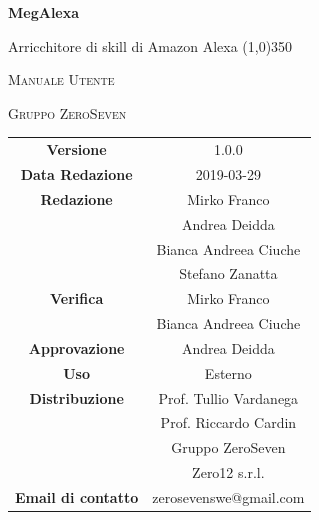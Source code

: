 \documentclass[a4paper,12pt,openany]{book}
\author{Ludovico Brocca}
\date{2018-12-19}
\begin{document}
\begin{titlepage}
	\centering
	{\huge\bfseries MegAlexa \par}
	Arricchitore di skill di Amazon Alexa
	\line(1,0){350} \\
	{\scshape\LARGE Manuale Utente \par}
	\vspace{1cm}
	{\scshape Gruppo ZeroSeven \par}
	\logo
	\begin{tabular}{c|c}
		{\hfill \textbf{Versione}} 			& 1.0.0 \\
		{\hfill\textbf{Data Redazione}} 	& 2019-03-29	\\ 
		{\hfill\textbf{Redazione}} 		& Mirko Franco \\ & Andrea Deidda \\& Bianca Andreea Ciuche\\ & Stefano Zanatta \\
		{\hfill\textbf{Verifica}} 				&  	Mirko Franco \\ & Bianca Andreea Ciuche \\
		{\hfill\textbf{Approvazione}} 		& Andrea Deidda \\
		{\hfill\textbf{Uso}} 					& 		Esterno		\\ 
		{\hfill\textbf{Distribuzione}} 			& 			Prof. Tullio Vardanega \\ & Prof. Riccardo Cardin \\ & Gruppo ZeroSeven	\\ & Zero12 s.r.l. \\
		{\hfill\textbf{Email di contatto}} & zerosevenswe@gmail.com \\
	\end{tabular}
\end{titlepage}
	
	\label{LastFrontPage}
	\newpage	
	
	\pagestyle{mymain}
	\tableofcontents
	\listoffigures
	
	
	
	
	\appendix
	
	\label{LastPage}
\end{document}
